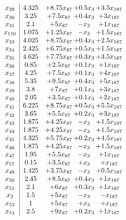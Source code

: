 \documentclass[11pt]{article}
\begin{document}
\[\begin{array}{c| c c@{\hskip 2pt} c@{\hskip 2pt} c@{\hskip 2pt} }
 x_{29}   &  4.325 & + 8.75 x_{87} & + 0.5 x_{3} & + 3.5 x_{187}\\
 x_{30}   &  3.25 & + 7.5 x_{87} & + 0.4 x_{3} & + 3 x_{187}\\
 x_{31}   &  2.1 & + 5 x_{87} & - x_{3} & + 1 x_{187}\\
 x_{110}   &  1.075 & + 1.25 x_{87} & - x_{3} & + 1.5 x_{187}\\
 x_{33}   &  4.025 & + 8.75 x_{87} & + 0.4 x_{3} & + 2.5 x_{187}\\
 x_{34}   &  2.425 & + 6.75 x_{87} & + 0.5 x_{3} & + 1.5 x_{187}\\
 x_{35}   &  4.625 & + 7.75 x_{87} & + 0.3 x_{3} & + 3.5 x_{187}\\
 x_{36}   &  0.85 & + 2.5 x_{87} & + 0.1 x_{3} & + 1 x_{187}\\
 x_{37}   &  4.25 & + 7.5 x_{87} & + 0.1 x_{3} & + 4 x_{187}\\
 x_{38}   &  5.35 & + 9.5 x_{87} & + 0.4 x_{3} & + 5 x_{187}\\
 x_{39}   &  3.8 & + 7 x_{87} & + 0.1 x_{3} & + 3 x_{187}\\
 x_{40}   &  2.05 & + 3.5 x_{87} & + 0.1 x_{3} & + 2 x_{187}\\
 x_{41}   &  6.225 & + 8.75 x_{87} & + 0.5 x_{3} & + 5.5 x_{187}\\
 x_{42}   &  3.65 & + 5.5 x_{87} & + 0.2 x_{3} & + 3 x_{187}\\
 x_{43}   &  1.875 & + 4.25 x_{87} & - x_{3} & + 1.5 x_{187}\\
 x_{44}   &  1.875 & + 4.25 x_{87} & - x_{3} & + 1.5 x_{187}\\
 x_{45}   &  4.325 & + 5.75 x_{87} & + 0.2 x_{3} & + 4.5 x_{187}\\
 x_{46}   &  1.875 & + 4.25 x_{87} & - x_{3} & + 1.5 x_{187}\\
 x_{47}   &  1.95 & + 5.5 x_{87} & - x_{3} & + 1 x_{187}\\
 x_{57}   &  0.15 & + 3.5 x_{87} & +  x_{3} & +  x_{187}\\
 x_{49}   &  1.425 & + 3.75 x_{87} & - x_{3} & + 0.5 x_{187}\\
 x_{50}   &  2.45 & + 8.5 x_{87} & + 0.4 x_{3} & + 1 x_{187}\\
 x_{51}   &  2.1 & + 6 x_{87} & + 0.3 x_{3} & + 1 x_{187}\\
 x_{2}   &  1.5 & + 5 x_{87} & - x_{3} & - x_{187}\\
 x_{53}   &  1 & + 5 x_{87} & +  x_{3} & +  x_{187}\\
 x_{54}   &  2.5 & + 9 x_{87} & + 0.2 x_{3} & + 1 x_{187}\\

\end{array}\]
\end{document}
